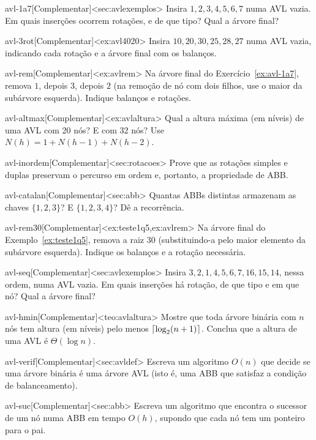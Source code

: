 \excompl
\begin{exercicio}{avl-1a7}[Complementar]<sec:avlexemplos>
Insira $1,2,3,4,5,6,7$ numa AVL vazia. Em quais inserções ocorrem rotações, e de que tipo? Qual a árvore final?
\end{exercicio}
\begin{exercicio}{avl-3rot}[Complementar]<ex:avl4020>
Insira $10,20,30,25,28,27$ numa AVL vazia, indicando cada rotação e a árvore final com os balanços.
\end{exercicio}
\begin{exercicio}{avl-rem}[Complementar]<ex:avlrem>
Na árvore final do Exercício~\ref{ex:avl-1a7}, remova $1$, depois $3$, depois $2$ (na remoção de nó com dois filhos, use o maior da subárvore esquerda). Indique balanços e rotações.
\end{exercicio}
\begin{exercicio}{avl-altmax}[Complementar]<ex:avlaltura>
Qual a altura máxima (em níveis) de uma AVL com 20 nós? E com 32 nós? Use $N(h)=1+N(h-1)+N(h-2)$.
\end{exercicio}
\begin{exercicio}{avl-inordem}[Complementar]<sec:rotacoes>
Prove que as rotações simples e duplas preservam o percurso em ordem e, portanto, a propriedade de ABB.
\end{exercicio}
\begin{exercicio}{avl-catalan}[Complementar]<sec:abb>
Quantas ABBs distintas armazenam as chaves $\{1,2,3\}$? E $\{1,2,3,4\}$? Dê a recorrência.
\end{exercicio}
\begin{exercicio}{avl-rem30}[Complementar]<ex:teste1q5,ex:avlrem>
Na árvore final do Exemplo~\ref{ex:teste1q5}, remova a raiz 30 (substituindo-a pelo maior elemento da subárvore esquerda). Indique os balanços e a rotação necessária.
\end{exercicio}
\begin{exercicio}{avl-seq}[Complementar]<sec:avlexemplos>
Insira $3,2,1,4,5,6,7,16,15,14$, nessa ordem, numa AVL vazia. Em quais inserções há rotação, de que tipo e em que nó? Qual a árvore final?
\end{exercicio}
\begin{exercicio}{avl-hmin}[Complementar]<teo:avlaltura>
Mostre que toda árvore binária com $n$ nós tem altura (em níveis) pelo menos $\lceil\log_2(n+1)\rceil$. Conclua que a altura de uma AVL é $\Theta(\log n)$.
\end{exercicio}
\begin{exercicio}{avl-verif}[Complementar]<sec:avldef>
Escreva um algoritmo $O(n)$ que decide se uma árvore binária é uma árvore AVL (isto é, uma ABB que satisfaz a condição de balanceamento).
\end{exercicio}
\begin{exercicio}{avl-suc}[Complementar]<sec:abb>
Escreva um algoritmo que encontra o sucessor de um nó numa ABB em tempo $O(h)$, supondo que cada nó tem um ponteiro para o pai.
\end{exercicio}
